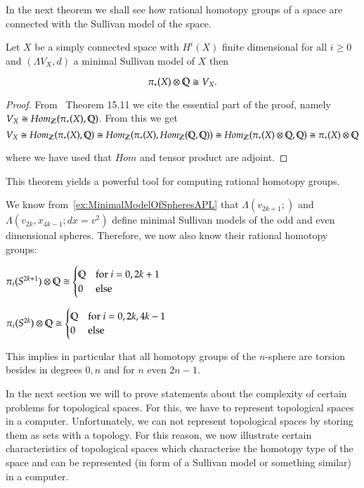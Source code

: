 In the next theorem we shall see how rational homotopy groups of a space are connected with 
the Sullivan model of the space.

\begin{Theorem}
\label{thm:MainTheoremOfRationalHomotopyTheory}
 Let $X$ be a simply connected space with $H^i(X)$ finite dimensional for all $i \geq 0$ and 
 $(\Lambda V_X, d)$ a minimal Sullivan model of $X$ then
 
 $$ \pi_*(X) \otimes \mathbb{Q} \cong V_X.$$
\end{Theorem}

\begin{proof}
 From~\cite{Felix2001} Theorem 15.11 we cite the essential part of the proof, namely $V_X \cong Hom_{\mathbb{Z}}(\pi_*(X), \mathbb{Q})$. 
 From this we get 
 $$ V_X \cong Hom_{\mathbb{Z}}(\pi_*(X), \mathbb{Q}) \cong Hom_{\mathbb{Z}}(\pi_*(X), Hom_{\mathbb{Z}}(\mathbb{Q}, \mathbb{Q})) \cong 
  Hom_{\mathbb{Z}}(\pi_*(X) \otimes \mathbb{Q}, \mathbb{Q}) \cong \pi_*(X) \otimes \mathbb{Q}$$
  
  where we have used that $Hom$ and tensor product are adjoint.
\end{proof}

This theorem yields a powerful tool for computing rational homotopy groups.
\begin{Example}
\label{ex:RationalHomotopyGroupsOfSpheres}
 We know from~\ref{ex:MinimalModelOfSpheresAPL} that $\Lambda(v_{2k+1};)$ and $\Lambda(v_{2k}, x_{4k -1}; dx = v^2)$
 define  minimal Sullivan models of the odd and even dimensional spheres. Therefore, we now also know their rational homotopy groups:
 
 \begin{multicols}{2}
  $\pi_i(S^{2k+1}) \otimes \mathbb{Q} \cong
  \begin{cases}
  \mathbb{Q}  	&\text{for $i = 0, 2k+1$} \\
  0 	&\text{else}
  \end{cases}
  $
  
  \columnbreak
  
  $\pi_i(S^{2k}) \otimes \mathbb{Q} \cong
  \begin{cases}
  \mathbb{Q}  	&\text{for $i = 0, 2k, 4k -1 $} \\
  0 	&\text{else}
  \end{cases}
  $
 \end{multicols}
This implies in particular that all homotopy groups of the $n$-sphere are torsion besides in degrees $0, n$
and for $n$ even $2n -1$.
\end{Example}

In the next section we will to prove statements about the complexity of certain problems for topological spaces.
For this, we have to represent topological spaces in a computer. Unfortunately, we can not represent topological
spaces by storing them as sets with a topology. For this reason, we now illustrate certain characteristics of
topological spaces which characterise the homotopy type of the space and can
be represented (in form of a Sullivan model or something similar) in a computer.

